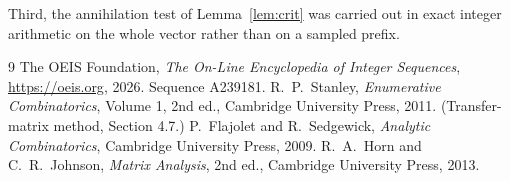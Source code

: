 \documentclass[11pt,a4paper]{article}
\theoremstyle{plain}
\theoremstyle{definition}
\begin{document}
Third, the annihilation test of Lemma~\ref{lem:crit} was carried out in exact integer
arithmetic on the whole vector rather than on a sampled prefix.

\begin{thebibliography}{9}
 The OEIS Foundation, \emph{The On-Line Encyclopedia of Integer
Sequences}, \url{https://oeis.org}, 2026. Sequence A239181.
 R.~P.~Stanley, \emph{Enumerative Combinatorics}, Volume 1, 2nd ed.,
Cambridge University Press, 2011. (Transfer-matrix method, Section 4.7.)
 P.~Flajolet and R.~Sedgewick, \emph{Analytic Combinatorics}, Cambridge
University Press, 2009.
 R.~A.~Horn and C.~R.~Johnson, \emph{Matrix Analysis}, 2nd ed., Cambridge
University Press, 2013.
\end{thebibliography}
\end{document}
